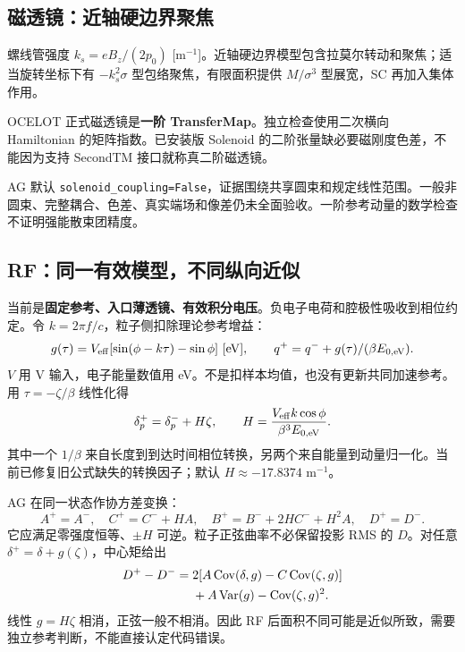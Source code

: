 \subsection{磁透镜：近轴硬边界聚焦}
螺线管强度 $k_s=eB_z/(2p_0)$ [m$^{-1}$]。近轴硬边界模型包含拉莫尔转动和聚焦；适当旋转坐标下有 $-k_s^2\sigma$ 型包络聚焦，有限面积提供 $M/\sigma^3$ 型展宽，SC 再加入集体作用。

OCELOT 正式磁透镜是\textbf{一阶 TransferMap}。独立检查使用二次横向 Hamiltonian 的矩阵指数。已安装版 Solenoid 的二阶张量缺必要磁刚度色差，不能因为支持 SecondTM 接口就称真二阶磁透镜。

AG 默认 \texttt{solenoid\_coupling=False}，证据围绕共享圆束和规定线性范围。一般非圆束、完整耦合、色差、真实端场和像差仍未全面验收。一阶参考动量的数学检查不证明强能散束团精度。

\subsection{RF：同一有效模型，不同纵向近似}
当前是\textbf{固定参考、入口薄透镜、有效积分电压}。负电子电荷和腔极性吸收到相位约定。令 $k=2\pi f/c$，粒子侧扣除理论参考增益：
\begin{equation}
 g(\tau)=V_{\rm eff}[\sin(\phi-k\tau)-\sin\phi]\ [\mathrm{eV}],\qquad
 q^+=q^-+g(\tau)/(\beta E_{0,\mathrm{eV}}).
 \label{eq:rfsine}
\end{equation}
$V$ 用 V 输入，电子能量数值用 eV。不是扣样本均值，也没有更新共同加速参考。用 $\tau=-\zeta/\beta$ 线性化得
\begin{equation}
 \delta_p^+=\delta_p^-+H\zeta,\qquad
 H=\frac{V_{\rm eff}k\cos\phi}{\beta^3 E_{0,\mathrm{eV}}}.
 \label{eq:rfh}
\end{equation}
其中一个 $1/\beta$ 来自长度到到达时间相位转换，另两个来自能量到动量归一化。当前已修复旧公式缺失的转换因子；默认 $H\approx-17.8374$ m$^{-1}$。

AG 在同一状态作协方差变换：
\begin{equation}
 A^+=A^-,\quad C^+=C^-+HA,\quad
 B^+=B^-+2HC^-+H^2A,\quad D^+=D^-.
 \label{eq:rfcov}
\end{equation}
它应满足零强度恒等、$\pm H$ 可逆。粒子正弦曲率不必保留投影 RMS 的 $D$。对任意 $\delta^+=\delta+g(\zeta)$，中心矩给出
\begin{align}
 D^+-D^-={}&2[A\operatorname{Cov}(\delta,g)-C\operatorname{Cov}(\zeta,g)]\notag\\
 &+A\operatorname{Var}(g)-\operatorname{Cov}(\zeta,g)^2.
 \label{eq:nonlinearkick}
\end{align}
线性 $g=H\zeta$ 相消，正弦一般不相消。因此 RF 后面积不同可能是近似所致，需要独立参考判断，不能直接认定代码错误。

